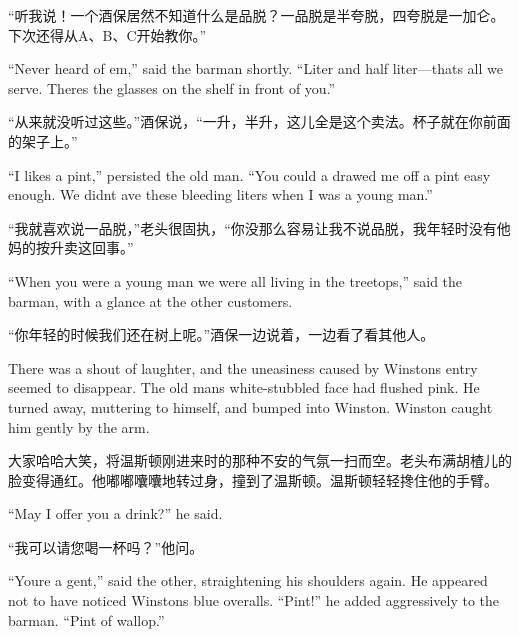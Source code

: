\begin{paracol}{2}
\switchcolumn

``听我说！一个酒保居然不知道什么是品脱？一品脱是半夸脱，四夸脱是一加仑。下次还得从A、B、C开始教你。''

\switchcolumn*

``Never heard of \textquotesingle em,'' said the barman shortly. ``Liter
and half liter---that\textquotesingle s all we serve.
There\textquotesingle s the glasses on the shelf in front of you.''

\switchcolumn

``从来就没听过这些。''酒保说，``一升，半升，这儿全是这个卖法。杯子就在你前面的架子上。''

\switchcolumn*

``I likes a pint,'' persisted the old man. ``You could \textquotesingle a
drawed me off a pint easy enough. We didn\textquotesingle t
\textquotesingle ave these bleeding liters when I was a young man.''

\switchcolumn

``我就喜欢说一品脱，''老头很固执，``你没那么容易让我不说品脱，我年轻时没有他妈的按升卖这回事。''

\switchcolumn*

``When you were a young man we were all living in the treetops,'' said the
barman, with a glance at the other customers.

\switchcolumn

``你年轻的时候我们还在树上呢。''酒保一边说着，一边看了看其他人。

\switchcolumn*

There was a shout of laughter, and the uneasiness caused by
Winston\textquotesingle s entry seemed to disappear. The old
man\textquotesingle s white-stubbled face had flushed pink. He turned
away, muttering to himself, and bumped into Winston. Winston caught him
gently by the arm.

\switchcolumn

大家哈哈大笑，将温斯顿刚进来时的那种不安的气氛一扫而空。老头布满胡楂儿的脸变得通红。他嘟嘟囔囔地转过身，撞到了温斯顿。温斯顿轻轻搀住他的手臂。

\switchcolumn*

``May I offer you a drink?'' he said.

\switchcolumn

``我可以请您喝一杯吗？''他问。

\switchcolumn*

``You\textquotesingle re a gent,'' said the other, straightening his
shoulders again. He appeared not to have noticed
Winston\textquotesingle s blue overalls. ``Pint!'' he added aggressively
to the barman. ``Pint of wallop.''


\end{paracol}
